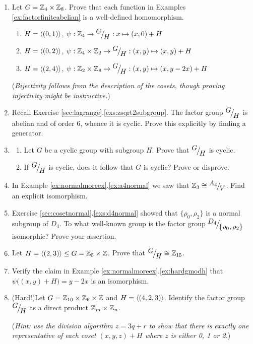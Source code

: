 \begin{exercises}
\begin{enumerate}
 	\item Let $G=\mathbb{Z}_4\times\mathbb{Z}_8$. Prove that each function in Examples \ref{ex:factorfiniteabelian} is a well-defined homomorphism.
	\begin{enumerate}\itemsep0pt
		\item $H=\left\langle (0,1)\right\rangle$, $\psi:\mathbb{Z}_4\to\smash{{}^{\textstyle {G}}\!\big/_{\textstyle \!{H}}}:x\mapsto (x,0)+H$
		\item $H=\left\langle (0,2)\right\rangle$, $\psi:\mathbb{Z}_4\times\mathbb{Z}_2\to{}^{\textstyle {G}}\!\big/_{\textstyle \!{H}}:(x,y)\mapsto (x,y)+H$
		\item $H=\left\langle (2,4)\right\rangle$, $\psi:\mathbb{Z}_2\times\mathbb{Z}_8\to\smash{{}^{\textstyle {G}}\!\big/_{\textstyle \!{H}}}:(x,y)\mapsto (x,y-2x)+H$
	\end{enumerate}
	(\emph{Bijectivity follows from the description of the cosets, though proving injectivity might be instructive.})
	
	
	\item Recall Exercise \ref*{sec:lagrange}.\ref{exs:zsqrt2subgroup}. The factor group ${}^{\textstyle {G}}\!\big/_{\textstyle \!{H}}$ is abelian and of order 6, whence it is cyclic. Prove this explicitly by finding a generator.
	
	
	\item\begin{enumerate}
  	\item Let $G$ be a cyclic group with subgroup $H$. Prove that $\smash[b]{{}^{\textstyle {G}}\!\big/_{\textstyle \!{H}}}$ is cyclic.
  	\item If ${}^{\textstyle {G}}\!\big/_{\textstyle \!{H}}$ is cyclic, does it follow that $G$ is cyclic? Prove or disprove.
	\end{enumerate}


	
	\item In Example \ref*{ex:normalmoreex}.\ref{ex:a4normal} we saw that $\mathbb{Z}_3\cong{}^{\textstyle {A_4}}\!\big/_{\textstyle \!{V}}$. Find an explicit isomorphism.


	\item Exercise \ref*{sec:cosetnormal}.\ref{exs:d4normal} showed that $\{\rho_0,\rho_2\}$ is a normal subgroup of $D_4$. To what well-known group is the factor group ${}^{\textstyle {D_4}}\!\big/_{\textstyle \!{\{\rho_0,\rho_2\}}}$ isomorphic? Prove your assertion.
	
	
	\item Let $H=\left\langle (2,3)\right\rangle\le G=\mathbb{Z}_5\times \mathbb{Z}$. Prove that ${}^{\textstyle {G}}\!\big/_{\textstyle \!{H}}\cong \mathbb{Z}_{15}$.
	
	\item Verify the claim in Example \ref*{ex:normalmoreex}.\ref{ex:hardgmodh} that $\psi\bigl((x,y)+H\bigr)=y-2x$ is an isomorphism.
	
	
	\item (Hard!)\lstsp Let $G=\mathbb{Z}_{10}\times\mathbb{Z}_6\times\mathbb{Z}$ and $H=\left\langle (4,2,3)\right\rangle$. Identify the factor group ${}^{\textstyle {G}}\!\big/_{\textstyle \!{H}}$ as a direct product $\mathbb{Z}_m\times\mathbb{Z}_n$.\par
	(\emph{Hint: use the division algorithm $z=3q+r$ to show that there is exactly one representative of each coset $(x,y,z)+H$ where $z$ is either 0, 1 or 2.})
	

\end{enumerate}
\end{exercises}
